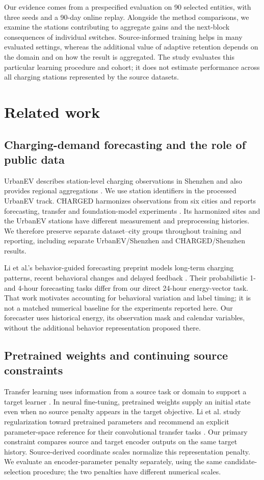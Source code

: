 \documentclass[pdflatex,iicol,sn-mathphys-num]{sn-jnl}
\begin{document}
Our evidence comes from a prespecified evaluation on 90 selected entities, with three seeds and a 90-day online replay. Alongside the method comparisons, we examine the stations contributing to aggregate gains and the next-block consequences of individual switches. Source-informed training helps in many evaluated settings, whereas the additional value of adaptive retention depends on the domain and on how the result is aggregated. The study evaluates this particular learning procedure and cohort; it does not estimate performance across all charging stations represented by the source datasets.

\section{Related work}\label{sec:related}
\subsection{Charging-demand forecasting and the role of public data}
UrbanEV describes station-level charging observations in Shenzhen and also provides regional aggregations \cite{urbanev2025}. We use station identifiers in the processed UrbanEV track. CHARGED harmonizes observations from six cities and reports forecasting, transfer and foundation-model experiments \cite{charged2025}. Its harmonized sites and the UrbanEV stations have different measurement and preprocessing histories. We therefore preserve separate dataset--city groups throughout training and reporting, including separate UrbanEV/Shenzhen and CHARGED/Shenzhen results.

Li et al.'s behavior-guided forecasting preprint models long-term charging patterns, recent behavioral changes and delayed feedback \cite{behavior2026}. Their probabilistic 1- and 4-hour forecasting tasks differ from our direct 24-hour energy-vector task. That work motivates accounting for behavioral variation and label timing; it is not a matched numerical baseline for the experiments reported here. Our forecaster uses historical energy, its observation mask and calendar variables, without the additional behavior representation proposed there.

\subsection{Pretrained weights and continuing source constraints}
Transfer learning uses information from a source task or domain to support a target learner \cite{pan2010}. In neural fine-tuning, pretrained weights supply an initial state even when no source penalty appears in the target objective. Li et al. study regularization toward pretrained parameters and recommend an explicit parameter-space reference for their convolutional transfer tasks \cite{li2018}. Our primary constraint compares source and target encoder outputs on the same target history. Source-derived coordinate scales normalize this representation penalty. We evaluate an encoder-parameter penalty separately, using the same candidate-selection procedure; the two penalties have different numerical scales.
\end{document}
